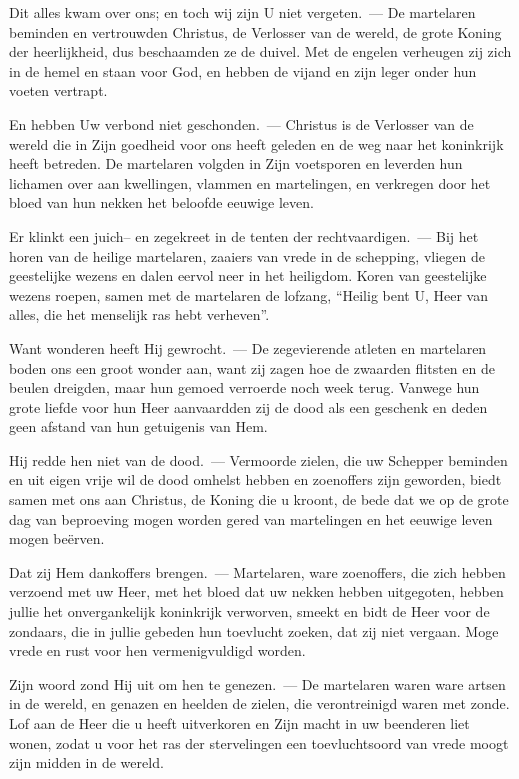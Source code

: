 \documentclass[12pt,twoside,a5paper]{article}
\begin{document}
\begin{halfparskip}

  Dit alles kwam over ons; en toch wij zijn U niet vergeten.~--- De martelaren beminden en vertrouwden Christus, de Verlosser van de wereld, de grote Koning der heerlijkheid, dus beschaamden ze de duivel. Met de engelen verheugen zij zich in de hemel en staan voor God, en hebben de vijand en zijn leger onder hun voeten vertrapt.

  En hebben Uw verbond niet geschonden.~--- Christus is de Verlosser van de wereld die in Zijn goedheid voor ons heeft geleden en de weg naar het koninkrijk heeft betreden. De martelaren volgden in Zijn voetsporen en leverden hun lichamen over aan kwellingen, vlammen en martelingen, en verkregen door het bloed van hun nekken het beloofde eeuwige leven.

  Er klinkt een juich-- en zegekreet in de tenten der rechtvaardigen.~--- Bij het horen van de heilige martelaren, zaaiers van vrede in de schepping, vliegen de geestelijke wezens en dalen eervol neer in het heiligdom. Koren van geestelijke wezens roepen, samen met de martelaren de lofzang, ``Heilig bent U, Heer van alles, die het menselijk ras hebt verheven''.

  Want wonderen heeft Hij gewrocht.~--- De zegevierende atleten en martelaren boden ons een groot wonder aan, want zij zagen hoe de zwaarden flitsten en de beulen dreigden, maar hun gemoed verroerde noch week terug. Vanwege hun grote liefde voor hun Heer aanvaardden zij de dood als een geschenk en deden geen afstand van hun getuigenis van Hem.

  Hij redde hen niet van de dood.~--- Vermoorde zielen, die uw Schepper beminden en uit eigen vrije wil de dood omhelst hebben en zoenoffers zijn geworden, biedt samen met ons aan Christus, de Koning die u kroont, de bede dat we op de grote dag van beproeving mogen worden gered van martelingen en het eeuwige leven mogen beërven.

  Dat zij Hem dankoffers brengen.~--- Martelaren, ware zoenoffers, die zich hebben verzoend met uw Heer, met het bloed dat uw nekken hebben uitgegoten, hebben jullie het onvergankelijk koninkrijk verworven, smeekt en bidt de Heer voor de zondaars, die in jullie gebeden hun toevlucht zoeken, dat zij niet vergaan. Moge vrede en rust voor hen vermenigvuldigd worden.

  Zijn woord zond Hij uit om hen te genezen.~--- De martelaren waren ware artsen in de wereld, en genazen en heelden de zielen, die verontreinigd waren met zonde. Lof aan de Heer die u heeft uitverkoren en Zijn macht in uw beenderen liet wonen, zodat u voor het ras der stervelingen een toevluchtsoord van vrede moogt zijn midden in de wereld.


\end{halfparskip}
\end{document}
